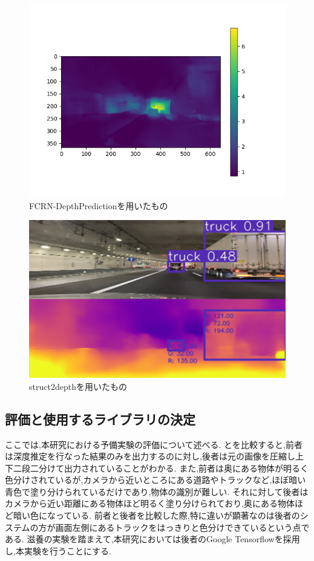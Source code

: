   \begin{figure}[htbp]
  \begin{center}
   \includegraphics[width=12cm]{figs/preex1.png}
  \end{center}
  \caption{FCRN-DepthPredictionを用いたもの}
  \label{fig:preex1}
\end{figure}

\begin{figure}[htbp]
 \begin{center}
  \includegraphics[width=12cm]{figs/preex2.png}
\end{center}
  \caption{struct2depthを用いたもの}
  \label{fig:preex2}
\end{figure}
\subsection{評価と使用するライブラリの決定}
ここでは,本研究における予備実験の評価について述べる.
とを比較すると,前者は深度推定を行なった結果のみを出力するのに対し,後者は元の画像を圧縮し上下二段二分けて出力されていることがわかる.
また,前者は奥にある物体が明るく色分けされているが,カメラから近いところにある道路やトラックなど,ほぼ暗い青色で塗り分けられているだけであり,物体の識別が難しい.
それに対して後者はカメラから近い距離にある物体ほど明るく塗り分けられており,奥にある物体ほど暗い色になっている.
前者と後者を比較した際,特に違いが顕著なのは後者のシステムの方が画面左側にあるトラックをはっきりと色分けできているという点である.
滋養の実験を踏まえて,本研究においては後者のGoogle Tensorflowを採用し,本実験を行うことにする.

